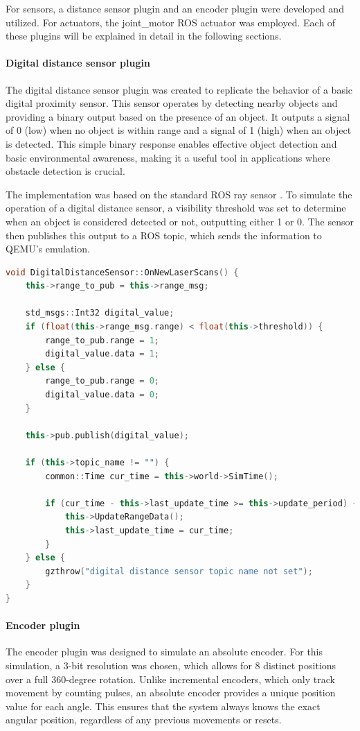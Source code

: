 \documentclass[../../monografia.tex]{subfiles}
\begin{document}
For sensors, a distance sensor plugin and an encoder plugin were developed and utilized. For actuators, the joint\_motor ROS actuator was employed. Each of these plugins will be explained in detail in the following sections.


\paragraph{Digital distance sensor plugin}
The digital distance sensor plugin was created to replicate the behavior of a basic digital proximity sensor. This sensor operates by detecting nearby objects and providing a binary output based on the presence of an object. It outputs a signal of 0 (low) when no object is within range and a signal of 1 (high) when an object is detected. This simple binary response enables effective object detection and basic environmental awareness, making it a useful tool in applications where obstacle detection is crucial.

The implementation was based on the standard ROS ray sensor \cite{ROS_Ray_Sensor_23}. To simulate the operation of a digital distance sensor, a visibility threshold was set to determine when an object is considered detected or not, outputting either 1 or 0. The sensor then publishes this output to a ROS topic, which sends the information to QEMU’s emulation.

\begin{lstlisting}[language=C++, caption={Digital distance sensor simulation with ray plugin}]
void DigitalDistanceSensor::OnNewLaserScans() {
    this->range_to_pub = this->range_msg;

    std_msgs::Int32 digital_value;
    if (float(this->range_msg.range) < float(this->threshold)) {
        range_to_pub.range = 1;
        digital_value.data = 1;
    } else {
        range_to_pub.range = 0;
        digital_value.data = 0;
    }

    this->pub.publish(digital_value);

    if (this->topic_name != "") {
        common::Time cur_time = this->world->SimTime();

        if (cur_time - this->last_update_time >= this->update_period) {
            this->UpdateRangeData();
            this->last_update_time = cur_time;
        }
    } else {
        gzthrow("digital distance sensor topic name not set");
    }
}
\end{lstlisting}

\paragraph{Encoder plugin}
The encoder plugin was designed to simulate an absolute encoder. For this simulation, a 3-bit resolution was chosen, which allows for 8 distinct positions over a full 360-degree rotation. Unlike incremental encoders, which only track movement by counting pulses, an absolute encoder provides a unique position value for each angle. This ensures that the system always knows the exact angular position, regardless of any previous movements or resets.
\end{document}
